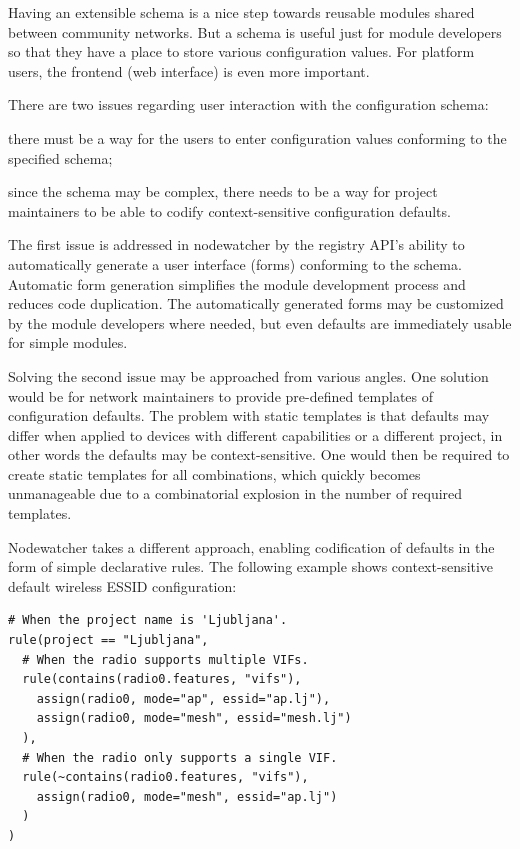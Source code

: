 \documentclass[5p,sort&compress]{elsarticle}
\begin{document}
Having an extensible schema is a nice step towards reusable modules shared between community networks.
But a schema is useful just for module developers so that they have a place to store various configuration values.
For platform users, the frontend (web interface) is even more important.

There are two issues regarding user interaction with the configuration schema:
\begin{enumerate*}[label=\itshape\alph*\upshape)]
\item there must be a way for the users to enter configuration values conforming to the specified schema;
\item since the schema may be complex, there needs to be a way for project maintainers to be able to codify context-sensitive configuration defaults.
\end{enumerate*}
The first issue is addressed in nodewatcher by the registry API's ability to automatically generate a user interface (forms) conforming to the schema.
Automatic form generation simplifies the module development process and reduces code duplication.
The automatically generated forms may be customized by the module developers where needed, but even defaults are immediately usable for simple modules.

Solving the second issue may be approached from various angles.
One solution would be for network maintainers to provide pre-defined templates of configuration defaults.
The problem with static templates is that defaults may differ when applied to devices with different capabilities or a different project, in other words the defaults may be context-sensitive.
One would then be required to create static templates for all combinations, which quickly becomes unmanageable due to a combinatorial explosion in the number of required templates.

Nodewatcher takes a different approach, enabling codification of defaults in the form of simple declarative rules. The following example shows context-sensitive default wireless ESSID configuration:
\begin{verbatim}
# When the project name is 'Ljubljana'.
rule(project == "Ljubljana",
  # When the radio supports multiple VIFs.
  rule(contains(radio0.features, "vifs"),
    assign(radio0, mode="ap", essid="ap.lj"),
    assign(radio0, mode="mesh", essid="mesh.lj")
  ),
  # When the radio only supports a single VIF.
  rule(~contains(radio0.features, "vifs"),
    assign(radio0, mode="mesh", essid="ap.lj")
  )
)
\end{verbatim}
\end{document}
